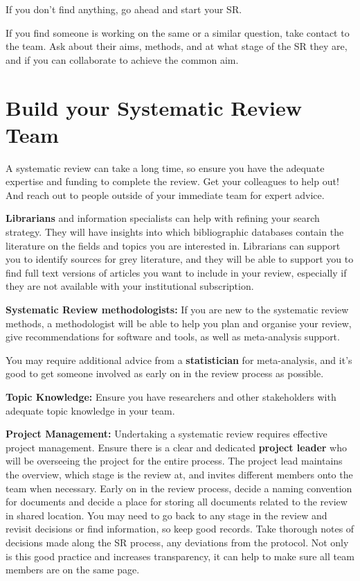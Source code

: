 \documentclass[
]{book}
\begin{document}
If you don't find anything, go ahead and start your SR.

If you find someone is working on the same or a similar question, take contact to the team. Ask about their aims, methods, and at what stage of the SR they are, and if you can collaborate to achieve the common aim.

\hypertarget{build-your-systematic-review-team}{%
\section{Build your Systematic Review Team}\label{build-your-systematic-review-team}}

A systematic review can take a long time, so ensure you have the adequate expertise and funding to complete the review. Get your colleagues to help out! And reach out to people outside of your immediate team for expert advice.

\textbf{Librarians} and information specialists can help with refining your search strategy. They will have insights into which bibliographic databases contain the literature on the fields and topics you are interested in. Librarians can support you to identify sources for grey literature, and they will be able to support you to find full text versions of articles you want to include in your review, especially if they are not available with your institutional subscription.

\textbf{Systematic Review methodologists:}
If you are new to the systematic review methods, a methodologist will be able to help you plan and organise your review, give recommendations for software and tools, as well as meta-analysis support.

You may require additional advice from a \textbf{statistician} for meta-analysis, and it's good to get someone involved as early on in the review process as possible.

\textbf{Topic Knowledge: }
Ensure you have researchers and other stakeholders with adequate topic knowledge in your team.

\textbf{Project Management:}
Undertaking a systematic review requires effective project management.
Ensure there is a clear and dedicated \textbf{project leader} who will be overseeing the project for the entire process. The project lead maintains the overview, which stage is the review at, and invites different members onto the team when necessary.
Early on in the review process, decide a naming convention for documents and decide a place for storing all documents related to the review in shared location. You may need to go back to any stage in the review and revisit decisions or find information, so keep good records. Take thorough notes of decisions made along the SR process, any deviations from the protocol. Not only is this good practice and increases transparency, it can help to make sure all team members are on the same page.
\end{document}
